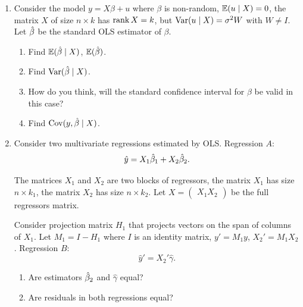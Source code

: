 \begin{enumerate}
    \item Consider the model $y = X\beta + u$ where $\beta$ is non-random,
    $\operatorname{\mathbb{E}}(u \mid X ) = 0$, the matrix $X$ of size $n\times k$ has $\operatorname{rank} X = k$, 
    but $\operatorname{Var}(u \mid X) = \sigma^2 W$ with $W \neq I$.
    Let $\hat{\beta}$ be the standard OLS estimator of $\beta$.

    \begin{enumerate}
        \item Find $\operatorname{\mathbb{E}}(\hat{\beta} \mid X)$, $\operatorname{\mathbb{E}}(\hat{\beta})$.
        \item Find $\operatorname{Var}(\hat{\beta} \mid X)$.
        \item How do you think, will the standard confidence interval for $\beta$ be valid in this case?
        \item Find $\operatorname{Cov}(y, \hat{\beta} \mid X)$.
    \end{enumerate}

    \item Consider two multivariate regressions estimated by OLS.
    Regression $A$: 
    \[
    \hat y = X_1 \hat{\beta}_1 + X_2 \hat{\beta}_2.
    \]
    
    The matrices $X_1$ and $X_2$ are two blocks of regressors, 
    the matrix $X_1$ has size $n\times k_1$, 
    the matrix $X_2$ has size $n\times k_2$.
    Let $X = \begin{pmatrix}
        X_1 X_2
    \end{pmatrix}$ be the full regressors matrix. 

    Consider projection matrix $H_1$ that projects vectors on the span of columns of $X_1$.
    Let $M_1 = I - H_1$ where $I$ is an identity matrix, $y' = M_1 y$, $X_2' = M_1 X_2$.
    Regression $B$:
    \[
    \hat y' = X_2' \hat{\gamma}.
    \]

    \begin{enumerate}
        \item Are estimators $\hat{\beta}_2$ and $\hat \gamma$ equal?
        \item Are residuals in both regressions equal?
    \end{enumerate}

\end{enumerate}

